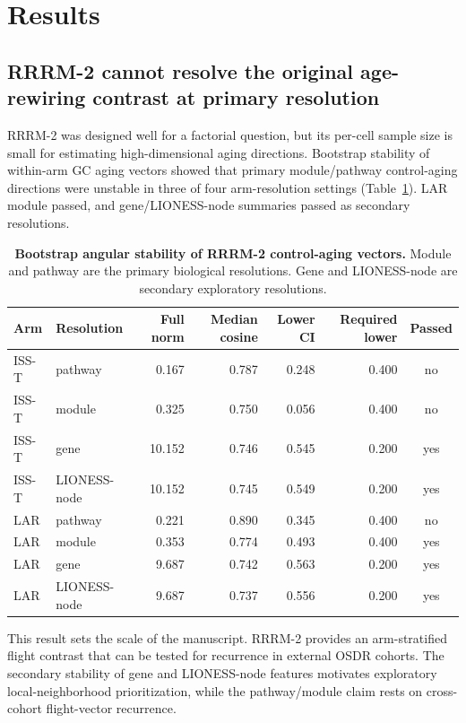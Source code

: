 \documentclass[11pt]{article}
\begin{document}
\section{Results}

\subsection{RRRM-2 cannot resolve the original age-rewiring contrast at primary resolution}

RRRM-2 was designed well for a factorial question, but its per-cell sample size is small for estimating high-dimensional aging directions. Bootstrap stability of within-arm GC aging vectors showed that primary module/pathway control-aging directions were unstable in three of four arm-resolution settings (Table~\ref{tab:stability}). LAR module passed, and gene/LIONESS-node summaries passed as secondary resolutions.

\begin{table}[H]
\centering\small
\begin{tabular}{llrrrrc}
\toprule
Arm & Resolution & Full norm & Median cosine & Lower CI & Required lower & Passed \\
\midrule
ISS-T & pathway & 0.167 & 0.787 & 0.248 & 0.400 & no \\
ISS-T & module & 0.325 & 0.750 & 0.056 & 0.400 & no \\
ISS-T & gene & 10.152 & 0.746 & 0.545 & 0.200 & yes \\
ISS-T & LIONESS-node & 10.152 & 0.745 & 0.549 & 0.200 & yes \\
LAR & pathway & 0.221 & 0.890 & 0.345 & 0.400 & no \\
LAR & module & 0.353 & 0.774 & 0.493 & 0.400 & yes \\
LAR & gene & 9.687 & 0.742 & 0.563 & 0.200 & yes \\
LAR & LIONESS-node & 9.687 & 0.737 & 0.556 & 0.200 & yes \\
\bottomrule
\end{tabular}
\caption{\textbf{Bootstrap angular stability of RRRM-2 control-aging vectors.} Module and pathway are the primary biological resolutions. Gene and LIONESS-node are secondary exploratory resolutions.}
\label{tab:stability}
\end{table}

This result sets the scale of the manuscript. RRRM-2 provides an arm-stratified flight contrast that can be tested for recurrence in external OSDR cohorts. The secondary stability of gene and LIONESS-node features motivates exploratory local-neighborhood prioritization, while the pathway/module claim rests on cross-cohort flight-vector recurrence.
\end{document}
